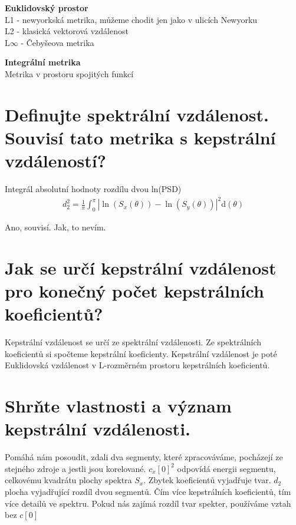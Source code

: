 \documentclass[a4paper,12pt]{article}   %
\newcommand{\mt}[1]{$#1$}
\newcommand{\dd}{\text{d}}
\begin{document}
\textbf{Euklidovský prostor}\\
L1 - newyorkská metrika, můžeme chodit jen jako v ulicích Newyorku\\
L2 - klasická vektorová vzdálenost\\
L\mt{\infty} - Čebyšeova metrika

\textbf{Integrální metrika}\\
Metrika v prostoru spojitých funkcí


\section{Definujte spektrální vzdálenost. Souvisí tato metrika s kepstrální vzdáleností?} 
Integrál absolutní hodnoty rozdílu dvou ln(PSD)
\begin{align*}
        d_2^2 = \frac{1}{\pi} \int _0^\pi |\ln(S_x(\theta)) - \ln(S_y(\theta))|^2\dd (\theta)
\end{align*}

Ano, souvisí. Jak, to nevím.


\section{Jak se určí kepstrální vzdálenost pro konečný počet kepstrálních koeficientů?}

Kepstrální vzdálenost se určí ze spektrální vzdálenosti. Ze spektrálních koeficientů si spočteme kepstrální koeficienty. Kepstrální vzdálenost je poté Euklidovská vzdálenost v L-rozměrném prostoru kepstrálních koeficientů.


\section{Shrňte vlastnosti a význam kepstrální vzdálenosti.}
\begin{outline}
        \1 Pomáhá nám posoudit, zdali dva segmenty, které zpracováváme, pocházejí ze stejného zdroje a jestli jsou korelované.
        \1 \mt{c_x[0]^2} odpovídá energii segmentu, celkovému kvadrátu plochy spektra \mt{S_x}. Zbytek koeficientů vyjadřuje tvar. 
        \1 \mt{d_2} plocha vyjadřující rozdíl dvou segmentů. 
        \1 Čím více kepstrálních koeficientů, tím více detailů ve spektru. 
        \1 Pokud nás zajímá rozdíl tvar spekter, používáme vztah bez \mt{c[0]}
\end{outline}




\clearpage 
\end{document}
